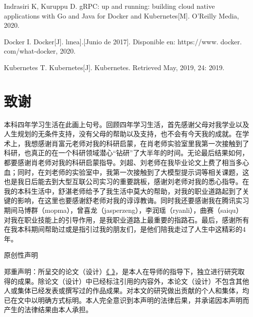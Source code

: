 \documentclass[UTF8,a4paper,12pt]{ctexart}
\numberwithin{equation}{section}
\begin{document}
\begin{thebibliography}{1}
 Indrasiri K, Kuruppu D. gRPC: up and running: building cloud native applications with Go and Java for Docker and Kubernetes[M]. O'Reilly Media, 2020.

 Docker I. Docker[J]. lınea].[Junio de 2017]. Disponible en: https://www. docker. com/what-docker, 2020.

 Kubernetes T. Kubernetes[J]. Kubernetes. Retrieved May, 2019, 24: 2019.


\end{thebibliography}

\newpage
{}

\renewcommand\refname{致谢}

\section*{致\quad 谢}
本科四年学习生活在此画上句号。回顾四年学习生活，首先感谢父母对我学业以及人生规划的无条件支持，没有父母的帮助以及支持，也不会有今天我的成就。在学术上，我想感谢肖富元老师对我的科研启蒙，在肖老师实验室里我第一次接触到了科研，也真正的在一个科研领域潜心“钻研”了大半年的时间。无论最后结果如何，都要感谢肖老师对我的科研启蒙指导。刘超、刘老师在我毕业论文上费了相当多心血；同时，在刘老师的实验室中，我第一次接触到了大模型提示词等相关课题，这也是我日后能去到大型互联公司实习的重要跳板，感谢刘老师对我的悉心指导。在我的本科生活中，舒湛老师给予了我生活中莫大的帮助，对我的职业道路起到了关键的影响，在这里也要感谢舒老师对我的谆谆教诲。同时我还要感谢我在腾讯实习期间马博群（mopma），曾喜龙（jasperzeng），李润瑶（ryanli），曲赛（saiqu）对我在职业技能上的引导作用，是我职业道路上最重要的指路石。最后，感谢所有在我本科期间帮助过或是指引过我的朋友们，是他们陪我走过了人生中这精彩的4年。
\newpage
\thispagestyle{empty}

\begin{center}
\heiti {}
原创性声明
\end{center}

\songti{}
郑重声明：所呈交的论文（设计）\underline{《  \hspace{6em}》}，是本人在导师的指导下，独立进行研究取得的成果。除论文（设计）中已经标注引用的内容外，本论文（设计）不包含其他人或集体已经发表或撰写过的作品成果。对本文的研究做出贡献的个人和集体，均已在文中以明确方式标明。本人完全意识到本声明的法律后果，并承诺因本声明而产生的法律结果由本人承担。
\end{document}
